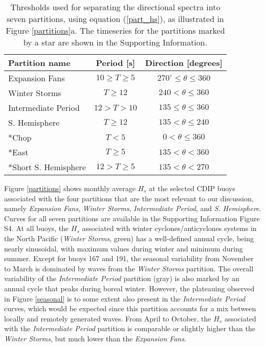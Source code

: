 \begin{table}
\caption{Thresholds used for separating the directional spectra into seven partitions, using equation (\ref{part_hs}), as illustrated in Figure \ref{partitions}a. The timeseries for the partitions marked by a star are shown in the Supporting Information.}
\centering
\begin{tabular}{l c c}
\hline
Partition name & Period [s] & Direction [degrees]\\
\hline
\hline
Expansion Fans & $10\geq T \geq 5$ & $270^\circ \leq \theta \leq 360$ \\
Winter Storms & $T\geq 12$ & $ 240 < \theta \leq 360$ \\
Intermediate Period & $12>T>10$ & $135 \leq \theta \leq 360$ \\
S. Hemisphere & $T \geq 12$ & $135 < \theta \leq 240$\\
*Chop & $T<5$ & $0 < \theta \leq 360$ \\
*East & $T \geq 5$ & $ 135 < \theta < 360$ \\
*Short S. Hemisphere & $12 > T \geq 5$ & $135 < \theta < 270$ \\
\hline
\end{tabular}
\label{part_table}
\end{table}
 
Figure \ref{partitions} shows monthly average $H_s$ at the selected CDIP buoys associated with the four partitions that are the most relevant to our discussion, namely \textit{Expansion Fans}, \textit{Winter Storms}, \textit{Intermediate Period}, and \textit{S. Hemisphere}. Curves for all seven partitions are available in the Supporting Information Figure S4. At all buoys, the $H_s$ associated with winter cyclones/anticyclones systems in the North Pacific (\textit{Winter Storms}, green) has a well-defined annual cycle, being nearly sinusoidal, with maximum values during winter and minimum during summer. Except for buoys 167 and 191, the seasonal variability from November to March is dominated by waves from the \textit{Winter Storms} partition. 
The overall variability of the \textit{Intermediate Period} partition (gray) is also marked by an annual cycle that peaks during boreal winter. However, the plateauing observed in Figure \ref{seasonal} is to some extent also present in the \textit{Intermediate Period} curves, which would be expected since this partition accounts for a mix between locally and remotely generated waves. From April to October, the $H_s$ associated with the \textit{Intermediate Period} partition is comparable or slightly higher than the \textit{Winter Storms}, but much lower than the \textit{Expansion Fans}. 

